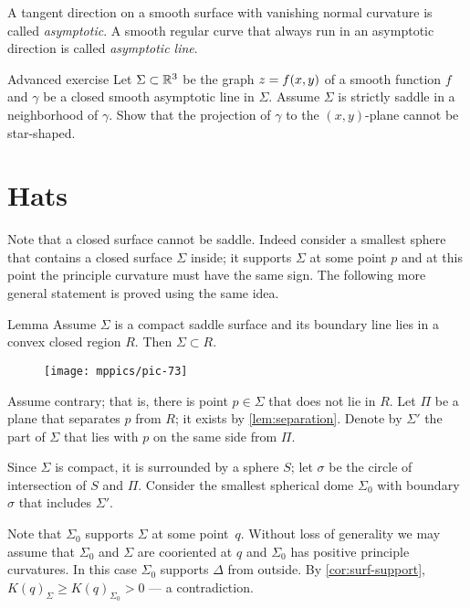 A tangent direction on a smooth surface with vanishing normal curvature is called \emph{asymptotic}.
A smooth regular curve that always run in an asymptotic direction is called
\emph{asymptotic line}.\label{page:asymptotic line}

\begin{thm}{Advanced exercise}
Let $\Sigma\subset \mathbb{R}^3$ be the graph $z\z=f(x,y)$
of a smooth function $f$ 
and $\gamma$ be a closed smooth asymptotic line in $\Sigma$.
Assume $\Sigma$ is strictly saddle in a neighborhood of $\gamma$.
Show that the projection of $\gamma$ to the $(x, y)$-plane cannot be star-shaped.
\end{thm}

\section*{Hats}

Note that a closed surface cannot be saddle.
Indeed consider a smallest sphere that contains a closed surface $\Sigma$ inside;
it supports $\Sigma$ at some point $p$ and at this point the principle curvature must have the same sign.
The following more general statement  is proved using the same idea.

\begin{thm}{Lemma}\label{lem:convex-saddle}
Assume $\Sigma$ is a compact saddle surface and its boundary line lies in a convex closed region $R$.
Then $\Sigma\subset R$.
\end{thm}

\begin{wrapfigure}{o}{50 mm}
\vskip-0mm
\centering
\texttt{[image: mppics/pic-73]}
\vskip0mm
\end{wrapfigure}

Assume contrary; that is, there is point $p\in \Sigma$ that does not lie in $R$.
Let $\Pi$ be a plane that separates $p$ from $R$; it exists by \ref{lem:separation}.
Denote by $\Sigma'$ the part of $\Sigma$ that lies with $p$ on the same side from $\Pi$.

Since $\Sigma$ is compact, it is surrounded by a sphere $S$;
let $\sigma$ be the circle of intersection of $S$ and $\Pi$.
Consider the smallest spherical dome $\Sigma_0$ with boundary $\sigma$ that includes $\Sigma'$.

Note that $\Sigma_0$ supports $\Sigma$ at some point~$q$.
Without loss of generality we may assume that $\Sigma_0$ and $\Sigma$ are cooriented at $q$ and $\Sigma_0$ has positive principle curvatures.
In this case $\Sigma_0$ supports $\Delta$ from outside.
By \ref{cor:surf-support}, $K(q)_\Sigma\ge K(q)_{\Sigma_0}>0$ --- a contradiction.
\qeds

